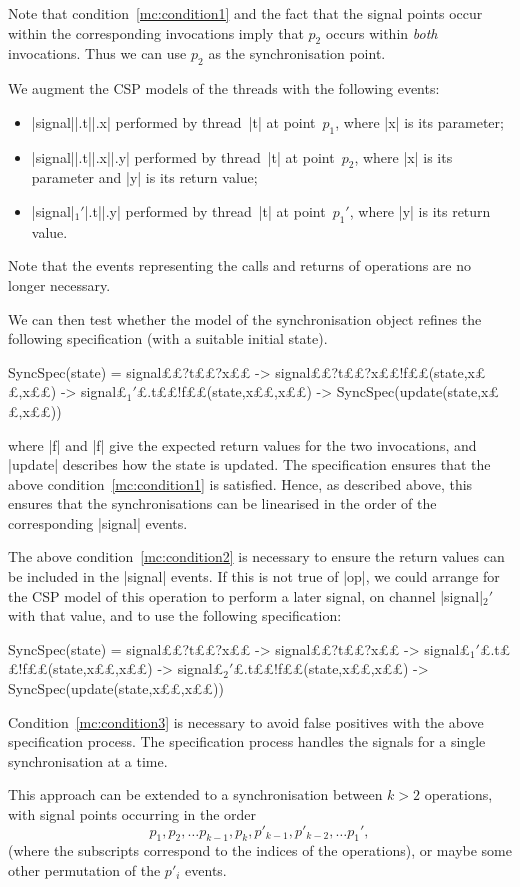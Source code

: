 
Note that condition~\ref{mc:condition1} and the fact that the signal points
occur within the corresponding invocations  imply that $p_2$ occurs within
\emph{both} invocations.  Thus we can use $p_2$ as the synchronisation point.

We augment the CSP models of the threads with the following events:
%
\begin{itemize}
\item |signal||.t||.x| performed by thread~|t| at point~$p_1$,
  where |x| is its parameter;

\item |signal||.t||.x||.y| performed by thread~|t| at
  point~$p_2$, where |x| is its parameter and |y| is its return value;

\item  |signal|$_1'$|.t||.y| performed by thread~|t| at
  point~$p_1'$, where |y| is its return value.
\end{itemize}
%
Note that the events representing the calls and returns of operations are no
longer necessary. 

We can then test whether the model of the synchronisation object refines the
following specification (with a suitable initial state).
%
\begin{cspm}
SyncSpec(state) = 
  signal££?t££?x££ -> signal££?t££?x££!f££(state,x££,x££) ->
  signal£$_1'$£.t££!f££(state,x££,x££) -> SyncSpec(update(state,x££,x££))
\end{cspm}
%
where |f| and |f| give the expected return values for the two
invocations, and |update| describes how the state is updated. 
The specification ensures that the above condition~\ref{mc:condition1} is
satisfied.  Hence, as described above, this ensures that the synchronisations
can be linearised in the order of the corresponding |signal| events. 

The above condition~\ref{mc:condition2} is necessary to ensure the return
values can be included in the |signal| events.  If this is not true of
|op|, we could arrange for the CSP model of this operation to perform a
later signal, on channel |signal|$_2'$ with that value, and to use the
following specification:
%
\begin{cspm}
SyncSpec(state) = 
  signal££?t££?x££ -> signal££?t££?x££ ->
  signal£$_1'$£.t££!f££(state,x££,x££) -> signal£$_2'$£.t££!f££(state,x££,x££) ->
  SyncSpec(update(state,x££,x££))
\end{cspm}

Condition~\ref{mc:condition3} is necessary to avoid false positives with the
above specification process.  The specification process handles the signals
for a single synchronisation at a time.

This approach can be extended to a synchronisation between $k > 2$ operations,
with signal points occurring in the order
\[
p_1, p_2, \ldots p_{k-1}, p_k, p'_{k-1}, p'_{k-2}, \ldots p_1',
\]
(where the subscripts correspond to the indices of the operations), or maybe
some other permutation of the $p'_i$ events. 


